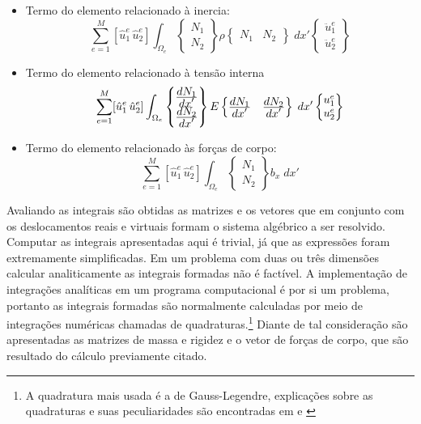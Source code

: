 \begin{itemize}
    \item Termo do elemento relacionado à inercia: \begin{equation}
        \sum_{e=1}^M [\hat{u}^e_1 \, \hat{u}^e_2 ] \int_{\Omega_e} \begin{Bmatrix} N_1 \\ N_2 \end{Bmatrix} \rho \begin{Bmatrix} N_1 & N_2 \end{Bmatrix} \; dx' \begin{Bmatrix} \ddot{u}^e_1 \\ \ddot{u}^e_2 \end{Bmatrix}
    \end{equation}
    
    \item Termo do elemento relacionado à tensão interna \begin{equation}
        \sum_{e=1}^M [\hat{u}^e_1 \, \hat{u}^e_2 ] \int_{\Omega_e} \begin{Bmatrix} \frac{\displaystyle dN_1}{\displaystyle dx'} \\ \frac{\displaystyle dN_2}{\displaystyle dx'}  \end{Bmatrix} E \begin{Bmatrix} \frac{\displaystyle dN_1}{\displaystyle dx'}  & \frac{\displaystyle dN_2}{\displaystyle dx'}  \end{Bmatrix} \; dx' \begin{Bmatrix} u^e_1 \\ u^e_2 \end{Bmatrix}
    \end{equation}
    
    \item Termo do elemento relacionado às forças de corpo: 
    \begin{equation}
        \sum_{e=1}^M [\hat{u}^e_1 \, \hat{u}^e_2 ] \int_{\Omega_e} \begin{Bmatrix} N_1 \\ N_2  \end{Bmatrix} b_x \; dx'
    \end{equation}
\end{itemize}

Avaliando as integrais são obtidas as matrizes e os vetores que em conjunto com os deslocamentos reais e virtuais formam o sistema algébrico a ser resolvido. Computar as integrais apresentadas aqui é trivial, já que as expressões foram extremamente simplificadas. Em um problema com duas ou três dimensões calcular analiticamente as integrais formadas não é factível. A implementação de integrações analíticas em um programa computacional é por si um problema, portanto as integrais formadas são normalmente calculadas por meio de integrações numéricas chamadas de quadraturas.\footnote{A quadratura mais usada é a de Gauss-Legendre, explicações sobre as quadraturas e suas peculiaridades são encontradas em \cite{Paulo} e \cite{zienkiewicz2013}} Diante de tal consideração são apresentadas as matrizes de massa e rigidez e o vetor de forças de corpo, que são resultado do cálculo previamente citado. 

